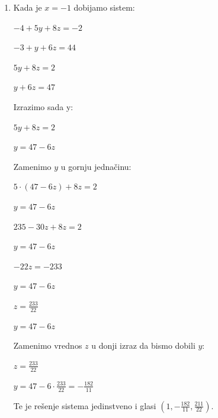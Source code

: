 \documentclass[a4paper,12pt]{report}
\begin{document}
\begin{enumerate}[1.]
\begin{enumerate}[1)]
\item Kada je $x = -1$ dobijamo sistem:
\begin{center}
\par $-4 + 5y +8z = -2$
\par $-3 + y + 6z = 44$
\end{center}
\begin{center}
\par $5y +8z = 2$
\par $y + 6z = 47$
\end{center}
\par Izrazimo sada y:
\begin{center}
\par $5y +8z = 2$
\par $y = 47 - 6z$
\end{center}
\par Zamenimo $y$ u gornju jedna\v{c}inu:
\begin{center}
\par $5 \cdot (47 - 6z) +8z = 2$
\par $y = 47 - 6z$
\end{center}
\begin{center}
\par $235-30z +8z = 2$
\par $y = 47 - 6z$
\end{center}
\begin{center}
\par $-22z=-233$
\par $y = 47 - 6z$
\end{center}
\begin{center}
\par $z = \frac{233}{22}$
\par $y = 47 - 6z$
\end{center}
\par Zamenimo vrednos $z$ u donji izraz da bismo dobili $y$:
\begin{center}
\par $z = \frac{233}{22}$
\par $y = 47 - 6 \cdot \frac{233}{22} = - \frac{182}{11}$
\end{center}
\par Te je re\v{s}enje sistema jedinstveno i glasi $(1,-\frac{182}{11}, \frac{211}{22})$.


\end{enumerate}
\end{enumerate}
\end{document}
